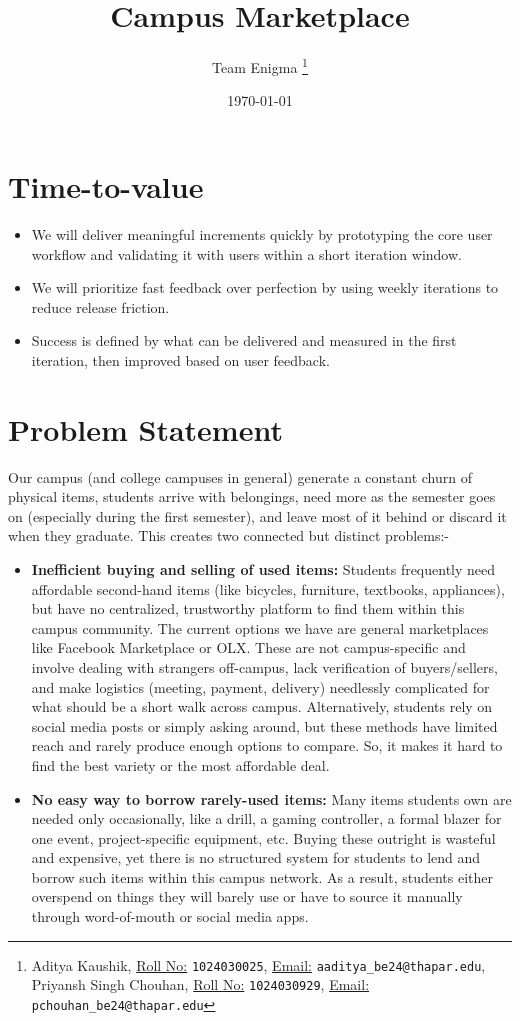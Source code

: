 \documentclass[12pt,a4paper]{article}
\title{\textbf{Campus Marketplace}}
\author{
  Team Enigma%
  \thanks{Aditya Kaushik, %
    \underline{Roll No:} \texttt{1024030025}, %
    \underline{Email:} \texttt{aaditya\_be24@thapar.edu},  \\%
    \hspace*{2.1em}Priyansh Singh Chouhan, %
    \underline{Roll No:} \texttt{1024030929}, %
    \underline{Email:} \texttt{pchouhan\_be24@thapar.edu}}
}
\date{\today}
\begin{document}
\maketitle

\section{Time-to-value}
\begin{itemize}[leftmargin=0.7cm]
    \item We will deliver meaningful increments quickly by prototyping the core user workflow and validating it with users within a short iteration window.
    \item We will prioritize fast feedback over perfection by using weekly iterations to reduce release friction.
    \item Success is defined by what can be delivered and measured in the first iteration, then improved based on user feedback.
\end{itemize}

\section{Problem Statement}
Our campus (and college campuses in general) generate a constant churn of physical items, students arrive with belongings, need more as the semester goes on (especially during the first semester), and leave most of it behind or discard it when they graduate. This creates two connected but distinct problems:-
\begin{itemize}[leftmargin=0.7cm]
    \item \textbf{Inefficient buying and selling of used items:}
Students frequently need affordable second-hand items (like bicycles, furniture, textbooks, appliances), but have no centralized, trustworthy platform to find them within this campus community. The current options we have are general marketplaces like Facebook Marketplace or OLX. These are not campus-specific and involve dealing with strangers off-campus, lack verification of buyers/sellers, and make logistics (meeting, payment, delivery) needlessly complicated for what should be a short walk across campus. Alternatively, students rely on social media posts or simply asking around, but these methods have limited reach and rarely produce enough options to compare. So, it makes it hard to find the best variety or the most affordable deal.
    \item \textbf{No easy way to borrow rarely-used items:}
Many items students own are needed only occasionally, like a drill, a gaming controller, a formal blazer for one event, project-specific equipment, etc. Buying these outright is wasteful and expensive, yet there is no structured system for students to lend and borrow such items within this campus network. As a result, students either overspend on things they will barely use or have to source it manually through word-of-mouth or social media apps.
\end{itemize}
\end{document}
